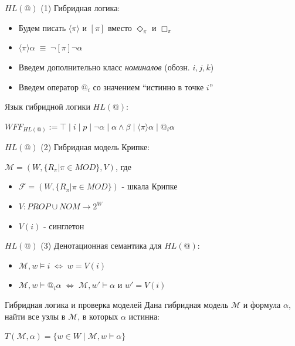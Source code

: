 \documentclass{beamer}
\begin{document}
\begin{frame}{$HL(@)$ (1)}
Гибридная логика:\\
\bigskip
\begin{itemize}
	\item Будем писать $\langle \pi \rangle$ и $[\pi]$ вместо $\Diamond_\pi$ и $\Box_\pi$
	\item $\langle \pi \rangle \alpha \; \equiv \; \neg [\pi] \neg \alpha$
	\item Введем дополнительно класс \textit{номиналов} (обозн. $i, j, k$)
	\item Введем оператор $@_i$ со значением ``истинно в точке $i$''
\end{itemize}
\bigskip
Язык гибридной логики $HL(@)$:\\
\begin{center}
$WFF_{HL(@)} := \top \; \vert \; i \; \vert \; p \; \vert \; \neg \alpha \; | \; \alpha \wedge \beta \; \vert \; \langle \pi \rangle \alpha \; \vert \; @_i \alpha$
\end{center}
\end{frame}

\begin{frame}{$HL(@)$ (2)}
Гибридная модель Крипке:\\
\bigskip
\begin{center}
$\mathcal{M} = (W, \{R_\pi \vert \pi \in MOD\}, V)$, где\\
\bigskip
\begin{itemize}
	\item $\mathcal{F} = (W, \{R_\pi \vert \pi \in MOD\})$ - шкала Крипке
	\item $V : PROP \cup NOM \to 2^W$
	\item $V(i)$ - синглетон
\end{itemize}
\end{center}
\end{frame}

\begin{frame}{$HL(@)$ (3)}
Денотационная семантика для $HL(@)$:\\
\bigskip
\begin{itemize}
	\item $\mathcal{M}, w \models i \; \Leftrightarrow \; w = V(i)$
	\item $\mathcal{M}, w \models @_i \alpha \; \Leftrightarrow \; \mathcal{M}, w' \models \alpha$ и $w' = V(i)$
\end{itemize}
\end{frame}


\begin{frame}{Гибридная логика и проверка моделей}
Дана гибридная модель $\mathcal{M}$ и формула $\alpha$, найти все узлы в $\mathcal{M}$, в которых $\alpha$ истинна:
\bigskip
\begin{center}
    $T(\mathcal{M}, \alpha) = \{ w \in W \; | \; \mathcal{M}, w \models \alpha \}$
\end{center}
\end{frame}
\end{document}
